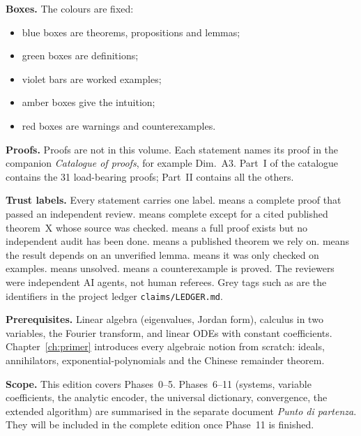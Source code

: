 \textbf{Boxes.} The colours are fixed:
\begin{itemize}
\item blue boxes are theorems, propositions and lemmas;
\item green boxes are definitions;
\item violet bars are worked examples;
\item amber boxes give the intuition;
\item red boxes are warnings and counterexamples.
\end{itemize}

\textbf{Proofs.} Proofs are not in this volume. Each statement names its proof in the companion \emph{Catalogue of proofs}, for example \textsf{\footnotesize\color{cA}Dim.~A3}. Part~I of the catalogue contains the 31 load-bearing proofs; Part~II contains all the others.

\textbf{Trust labels.} Every statement carries one label. \proved{} means a complete proof that passed an independent review.  means complete except for a cited published theorem~X whose source was checked. \pw{} means a full proof exists but no independent audit has been done. \cf{} means a published theorem we rely on. \condl{} means the result depends on an unverified lemma. \vex{} means it was only checked on examples. \openq{} means unsolved. \falsest{} means a counterexample is proved. The reviewers were independent AI agents, not human referees. Grey tags such as  are the identifiers in the project ledger \texttt{claims/LEDGER.md}.

\textbf{Prerequisites.} Linear algebra (eigenvalues, Jordan form), calculus in two variables, the Fourier transform, and linear ODEs with constant coefficients. Chapter~\ref{ch:primer} introduces every algebraic notion from scratch: ideals, annihilators, exponential-polynomials and the Chinese remainder theorem.

\textbf{Scope.} This edition covers Phases~0--5. Phases~6--11 (systems, variable coefficients, the analytic encoder, the universal dictionary, convergence, the extended algorithm) are summarised in the separate document \emph{Punto di partenza}. They will be included in the complete edition once Phase~11 is finished.
